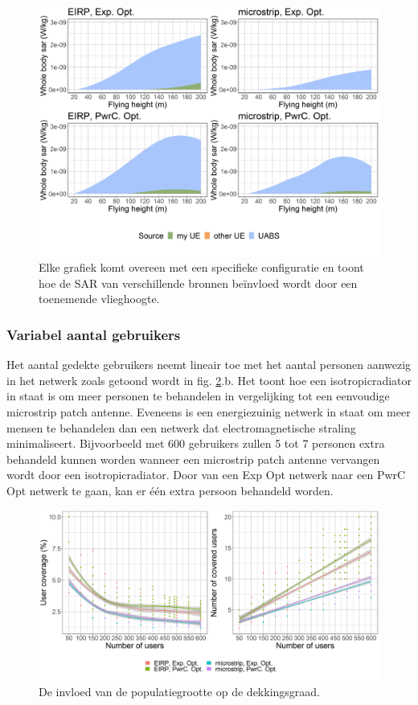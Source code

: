 \documentclass[twocolumn]{phdsymp_dutch}
\begin{document}
\begin{figure}[h!]
\centering
  \includegraphics[width=\linewidth]{s2/fhFourSources.png}
  \caption{Elke grafiek komt overeen met een specifieke configuratie en toont hoe de 
     \acs{SAR} van verschillende bronnen be\"invloed wordt door een toenemende vlieghoogte.}
  \label{fig:s2shfourSourcesMatrix}
\end{figure}

\FloatBarrier
\subsubsection{Variabel aantal gebruikers}
Het aantal gedekte gebruikers neemt lineair toe met het aantal personen aanwezig in het netwerk zoals getoond wordt in fig.
\ref{fig:s2uvsnumcovusers}.b. Het toont hoe een \gls{isotropicradiator} in staat is om meer personen te behandelen in vergelijking tot een eenvoudige
 microstrip patch antenne. Eveneens is een energiezuinig netwerk in staat om meer mensen te behandelen dan een netwerk dat electromagnetische straling minimaliseert.
 Bijvoorbeeld met 600 gebruikers zullen 5 tot 7 personen extra behandeld kunnen worden wanneer 
 een microstrip patch antenne vervangen wordt door een  \gls{isotropicradiator}.
Door van een \gls{Exp Opt} netwerk naar een \gls{PwrC Opt} netwerk te gaan, kan er \'e\'en extra persoon 
behandeld worden.

\begin{figure}[h!]
  \includegraphics[width=\linewidth]{s2/uvsnumdronesAndCov.png}
  \caption{De invloed van de populatiegrootte op de dekkingsgraad.}
  \label{fig:s2uvsnumcovusers}
\end{figure}
\end{document}
